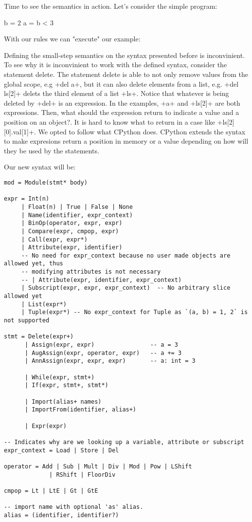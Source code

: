 Time to see the semantics in action. Let's consider the simple program:

\begin{pythoncode}
b = 2
a = b < 3
\end{pythoncode}

With our rules we can "execute" our example:


Defining the small-step semantics on the syntax presented before is inconvinient. To see
why it is inconvinient to work with the defined syntax, consider the statement delete. The
statement delete is able to not only remove values from the global scope, e.g \pycode+del
a+, but it can also delete elements from a list, e.g. \pycode+del ls[2]+ delets the third
element of a list \pycode+ls+. Notice that whatever is being deleted by \pycode+del+ is an
expression. In the examples, \pycode+a+ and \pycode+ls[2]+ are both expressions. Then,
what should the expression return to indicate a value and a position on an object?. It is
hard to know what to return in a case like \pycode+ls[2][0].val[1]+. We opted to follow
what CPython does. CPython extends the syntax to make expresions return a position in memory
or a value depending on how will they be used by the statements.

Our new syntax will be:

\begin{verbatim}
mod = Module(stmt* body)

expr = Int(n)
     | Float(n) | True | False | None
     | Name(identifier, expr_context)
     | BinOp(operator, expr, expr)
     | Compare(expr, cmpop, expr)
     | Call(expr, expr*)
     | Attribute(expr, identifier)
     -- No need for expr_context because no user made objects are allowed yet, thus
     -- modifying attributes is not necessary
     -- | Attribute(expr, identifier, expr_context)
     | Subscript(expr, expr, expr_context)  -- No arbitrary slice allowed yet
     | List(expr*)
     | Tuple(expr*) -- No expr_context for Tuple as `(a, b) = 1, 2` is not supported

stmt = Delete(expr+)
      | Assign(expr, expr)                -- a = 3
      | AugAssign(expr, operator, expr)   -- a += 3
      | AnnAssign(expr, expr, expr)       -- a: int = 3

      | While(expr, stmt+)
      | If(expr, stmt+, stmt*)

      | Import(alias+ names)
      | ImportFrom(identifier, alias+)

      | Expr(expr)

-- Indicates why are we looking up a variable, attribute or subscript
expr_context = Load | Store | Del

operator = Add | Sub | Mult | Div | Mod | Pow | LShift
             | RShift | FloorDiv

cmpop = Lt | LtE | Gt | GtE

-- import name with optional 'as' alias.
alias = (identifier, identifier?)
\end{verbatim}

